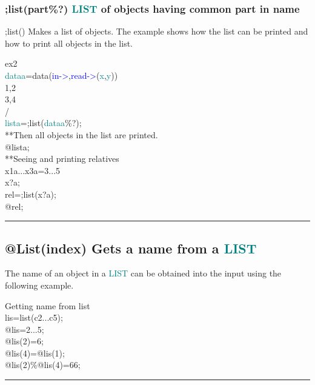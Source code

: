 \subsubsection{;list(part\%?) \textcolor{teal}{LIST} of objects having common part in name} 
\label{inpusub2} 
;list() Makes a list of objects. The example shows how the list can be printed and how 
to print all objects in the list. 
 
\singlespacing 
\begin{example}[subobjex2]ex2\\ 
\label{subobjex2} 
\noindent \textcolor{teal}{dataa}=\textcolor{VioletRed}{data}(\textcolor{blue}{in->},\textcolor{blue}{read->}(\textcolor{teal}{x},\textcolor{teal}{y}))\\ 
1,2\\ 
3,4\\ 
/  \\ 
\textcolor{teal}{lista}=;list(\textcolor{teal}{dataa}\%?);\\ 
{\color{ForestGreen}**Then all objects in the list are printed.}\\ 
@lista;\\ 
{\color{ForestGreen}**Seeing and printing relatives}\\ 
x1a...x3a=3...5\\ 
x?a;\\ 
rel=;list(x?a);\\ 
@rel;\\ 
\end{example} 
\vspace{-7mm} \rule{5cm}{0.1pt} 
\onehalfspacing 
\subsection{@List(index) Gets a name from a \textcolor{teal}{LIST}} 
\label{inpulistelem} 
The name of an object in a \textcolor{teal}{LIST} can be obtained into the input using the following example. 
\singlespacing 
\begin{example}[inpulistelem]Getting name from list\\ 
\label{inpulistelem} 
\noindent lis=\textcolor{VioletRed}{list}(c2...c5);\\ 
@lis=2...5;\\ 
@lis(2)=6;\\ 
@lis(4)=@lis(1);\\ 
@lis(2)\%@lis(4)=66;\\ 
\end{example} 
\vspace{-7mm} \rule{5cm}{0.1pt} 
\onehalfspacing 
